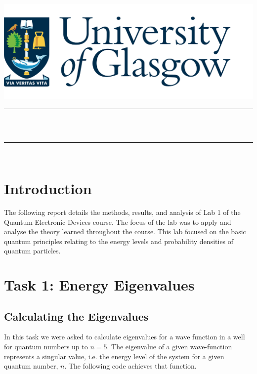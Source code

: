 \documentclass[a4paper,12pt]{article}
\makeatletter
\def\maketitle{
  \begin{center}\leavevmode
       \normalfont
       \includegraphics[width=1\columnwidth]{UoG Logo Transparent BG.png}
       \vskip 1.5cm   
       \textsc{\large \department}\\
       \vskip 1.5cm
       \rule{\linewidth}{0.3 mm} \\
       \vskip 0.5cm
       {\large \course}\\[1 cm]
       {\huge \bfseries \@title \par}
       \vspace{0.7cm}
	\rule{\linewidth}{0.2 mm} \\[1.5 cm]
	
    \textbf{\large \@author}
	\vskip 0.5cm
	\textbf{\studentID}	
	

	\vfill
	{\Large \@date\par}
   \end{center}
   \cleardoublepage
  }
\makeatother
\begin{document}

\maketitle

\clearpage
\tableofcontents
\clearpage



\section{Introduction}
The following report details the methods, results, and analysis of Lab 1 of the Quantum Electronic Devices course. The focus of the lab was to apply and analyse the theory learned throughout the course. This lab focused on the basic quantum principles relating to the energy levels and probability densities of quantum particles.

\section{Task 1: Energy Eigenvalues}
\subsection{Calculating the Eigenvalues}
In this task we were asked to calculate eigenvalues for a wave function in a well for quantum numbers up to \(n = 5\). The eigenvalue of a given wave-function represents a singular value, i.e. the energy level of the system for a given quantum number, \(n\). The following code achieves that function.
\end{document}
